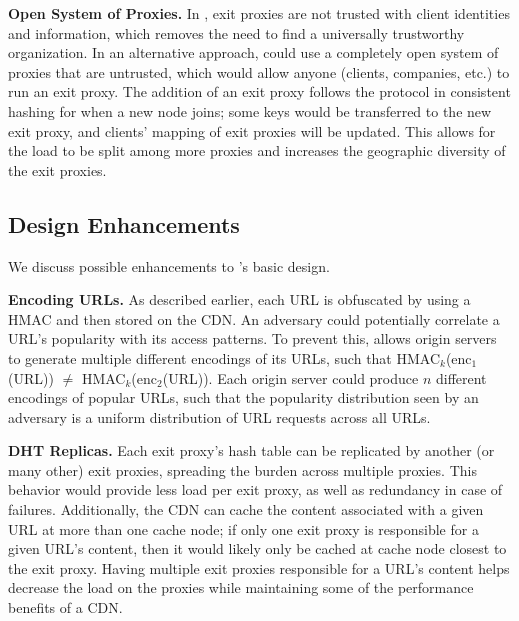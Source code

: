 {\bf Open System of Proxies.} In \system{}, exit proxies are not 
trusted with client identities and information, which removes the need to find a universally trustworthy 
organization.  In an alternative approach, \system{} could use a completely open system of proxies that are 
untrusted, which would allow anyone (clients, companies, etc.) to run an exit proxy.  
The addition of an exit proxy follows the protocol in consistent hashing for when a new node 
joins; some keys would be transferred to the new exit proxy, and clients' mapping of 
exit proxies will be updated.  This allows for the load to be split among more proxies and 
increases the geographic diversity of the exit proxies.  

\subsection{Design Enhancements}

We discuss possible enhancements to \system{}'s basic design.


\textbf{Encoding URLs.}
As described earlier, each URL is obfuscated by using a HMAC and then stored on the CDN.  An adversary 
could potentially correlate a URL's popularity with its access patterns.  To prevent this, \system{} allows 
origin servers to generate multiple different encodings of its URLs, such that HMAC$_k$(enc$_1$(URL)) $\neq$ 
HMAC$_k$(enc$_2$(URL)).  Each origin server could produce $n$ different encodings of popular URLs, such that 
the popularity distribution seen by an adversary is a uniform distribution of URL requests across all URLs.  

\textbf{DHT Replicas.}
Each exit proxy's hash table can be replicated by another (or many other) exit proxies, spreading the burden across multiple proxies. This behavior would provide less load per exit proxy, as well as redundancy in case of failures.  Additionally, 
the CDN can cache the content associated with a given URL at more than one cache
node;
if only one exit proxy is responsible for a given URL's content, then it would likely only be cached at 
cache node closest to the exit proxy.  Having multiple exit proxies responsible for a URL's content 
helps decrease the load on the proxies while maintaining some of the performance benefits of a CDN.

